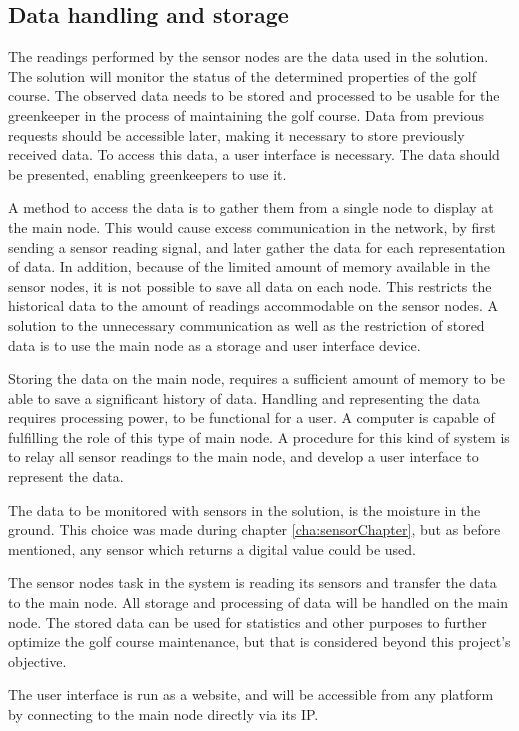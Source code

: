 \iffalse
Because of the temporal limitations of the project, the user interface has not been prioritized and accordingly, no thorough development of the user interface or experience is performed. \todo{move to reflection?}
Synes ikke det giver mening at skrive her - vi har jo interface nok til det er brugbart.
\fi

\subsection{Data handling and storage}
The readings performed by the sensor nodes are the data used in the solution. The solution will monitor the status of the determined properties of the golf course. The observed data needs to be stored and processed to be usable for the greenkeeper in the process of maintaining the golf course. Data from previous requests should be accessible later, making it necessary to store previously received data. To access this data, a user interface is necessary. The data should be presented, enabling greenkeepers to use it.%

A method to access the data is to gather them from a single node to display at the main node. This would cause excess communication in the network, by first sending a sensor reading signal, and later gather the data for each representation of data. In addition, because of the limited amount of memory available in the sensor nodes, it is not possible to save all data on each node. This restricts the historical data to the amount of readings accommodable on the sensor nodes. A solution to the unnecessary communication as well as the restriction of stored data is to use the main node as a storage and user interface device.

Storing the data on the main node, requires a sufficient amount of memory to be able to save a significant history of data. Handling and representing the data requires processing power, to be functional for a user. A computer is capable of fulfilling the role of this type of main node. A procedure for this kind of system is to relay all sensor readings to the main node, and develop a user interface to represent the data. 

The data to be monitored with sensors in the solution, is the moisture in the ground. This choice was made during chapter \ref{cha:sensorChapter}, but as before mentioned, any sensor which returns a digital value could be used.

The sensor nodes task in the system is reading its sensors and transfer the data to the main node. All storage and processing of data will be handled on the main node.
The stored data can be used for statistics and other purposes to further optimize the golf course maintenance, but that is considered beyond this project's objective.

The user interface is run as a website, and will be accessible from any platform by connecting to the main node directly via its IP.